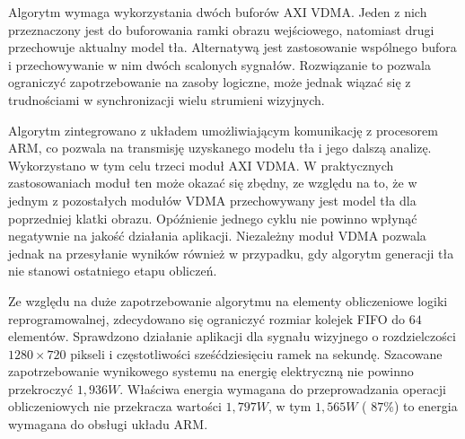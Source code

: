 Algorytm wymaga wykorzystania dwóch buforów AXI VDMA. 
Jeden z nich przeznaczony jest do buforowania ramki obrazu wejściowego, natomiast drugi przechowuje aktualny model tła. 
Alternatywą jest zastosowanie wspólnego bufora i przechowywanie w nim dwóch scalonych sygnałów. Rozwiązanie to pozwala ograniczyć zapotrzebowanie na zasoby logiczne, może jednak wiązać się z trudnościami w synchronizacji wielu strumieni wizyjnych.%

Algorytm zintegrowano z układem umożliwiającym komunikację z procesorem ARM, co pozwala na transmisję uzyskanego modelu tła i jego dalszą analizę. %
Wykorzystano w tym celu trzeci moduł AXI VDMA. %
W praktycznych zastosowaniach moduł ten może okazać się zbędny, ze względu na to, że w jednym z pozostałych modułów VDMA przechowywany jest model tła dla poprzedniej klatki obrazu. 
Opóźnienie jednego cyklu nie powinno wpłynąć negatywnie na jakość działania aplikacji. 
Niezależny moduł VDMA pozwala jednak na przesyłanie wyników również w przypadku, gdy algorytm generacji tła nie stanowi ostatniego etapu obliczeń.


Ze względu na duże zapotrzebowanie algorytmu na elementy obliczeniowe logiki reprogramowalnej, zdecydowano się ograniczyć rozmiar kolejek FIFO do $64$ elementów.
Sprawdzono działanie aplikacji dla sygnału wizyjnego o rozdzielczości $1280 \times 720$ pikseli i częstotliwości sześćdziesięciu ramek na sekundę.
Szacowane zapotrzebowanie wynikowego systemu na energię elektryczną nie powinno przekroczyć $1,936W$. Właściwa energia wymagana do przeprowadzania operacji obliczeniowych nie przekracza wartości $1,797W$, w tym $1,565W$ ( $87\%$) to energia wymagana do obsługi układu ARM.


